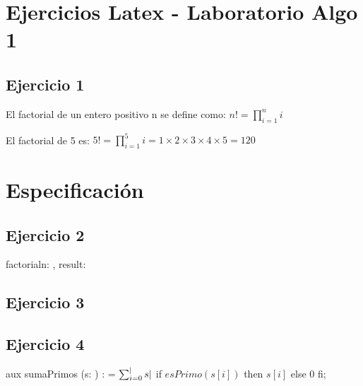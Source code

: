 \documentclass{article}
\begin{document}

\maketitle
\tableofcontents
\newpage

\section*{Ejercicios Latex - Laboratorio Algo 1}

\subsection*{Ejercicio 1}

El factorial de un entero positivo n se define como: $ n! = \prod_{i = 1}^n i $  \par
\medskip El factorial de 5 es: $ 5! = \prod_{i = 1}^5 i = 1 \times 2 \times 3 \times 4 \times 5 = 120 $

\section*{Especificación}

\subsection*{Ejercicio 2}

\begin{proc}{factorial}{\In n: \ent, \Out result: \ent}{}
\end{proc}

\subsection*{Ejercicio 3}


\medskip {}

\subsection*{Ejercicio 4}

aux sumaPrimos (s: \TLista \ent) : \ent = $\sum_{i = 0}^ \longitud s $ if $esPrimo(s[i])$ then $s[i]$ else 0 fi;
\end{document}
